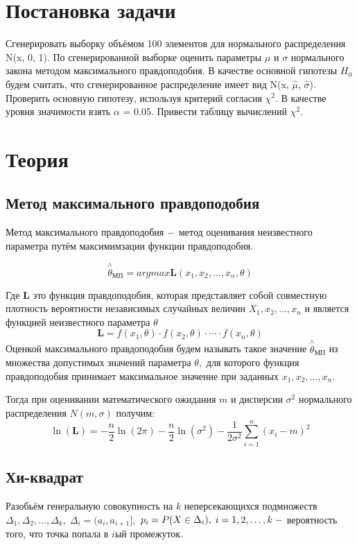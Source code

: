 \documentclass[a4]{article}
\begin{document}
	
	\newpage
	\tableofcontents{}
	\newpage
	\listoffigures
	\newpage
	\listoftables
	\newpage
	
	
	\section{Постановка задачи}
		Сгенерировать выборку объёмом 100 элементов для нормального распределения N(x, 0, 1). По сгенерированной выборке оценить параметры $\mu$ и $\sigma$ нормального закона методом максимального правдоподобия. В качестве основной гипотезы $H_0$ будем считать, что сгенерированное распределение имеет вид N(x, $\hat{\mu}$, $\hat{\sigma}$). Проверить основную гипотезу, используя критерий согласия $\chi^2$. В качестве уровня значимости взять $\alpha$ = 0.05. Привести таблицу вычислений $\chi^2$.
	\section{Теория}
		\subsection{Метод максимального правдоподобия}
		Метод максимального правдоподобия $\--$ метод оценивания неизвестного параметра путём максимимзации функции правдоподобия.
		
		$$\overset{\wedge}{\theta}_{\text{МП}}=argmax \mathbf{L}(x_1,x_2,\ldots,x_n,\theta)
		$$
		
		Где $\mathbf{L}$ это функция правдоподобия, которая представляет собой совместную плотность вероятности независимых случайных величин $X_1,x_2,\ldots,x_n$ и является функцией неизвестного параметра $\theta$
		$$\mathbf{L} = f(x_1,\theta)\cdot f(x_2,\theta)\cdot\cdots\cdot f(x_n,\theta)
		$$
		Оценкой максимального правдоподобия будем называть такое значение $\overset{\wedge}{\theta}_{\text{МП}}$ из множества допустимых значений параметра $\theta,$ для которого функция правдоподобия принимает максимальное значение при заданных $x_1,x_2,\ldots,x_n.$
		
		Тогда при оценивании математического ожидания $m$ и дисперсии $\sigma^2$ нормального распределения $N(m,\sigma)$ получим:
		$$\ln(\mathbf{L})=-\frac{n}{2}\ln(2\pi)-\frac{n}{2}\ln\left(\sigma^2\right)-\frac{1}{2\sigma^2}\sum\limits_{i=1}^n(x_i-m)^2
		$$
		\subsection{Хи-квадрат}
		Разобьём генеральную совокупность на $k$ неперсекающихся подмножеств $\Delta_1, \Delta_2,\ldots, \Delta_k,\;\Delta_i = (a_i,a_{i+1}],$ $p_i = P(X\in\Delta_i),\;i=1,2,\ldots,k\; \--$ вероятность того, что точка попала в $i$ый промежуток.
		
\end{document}
